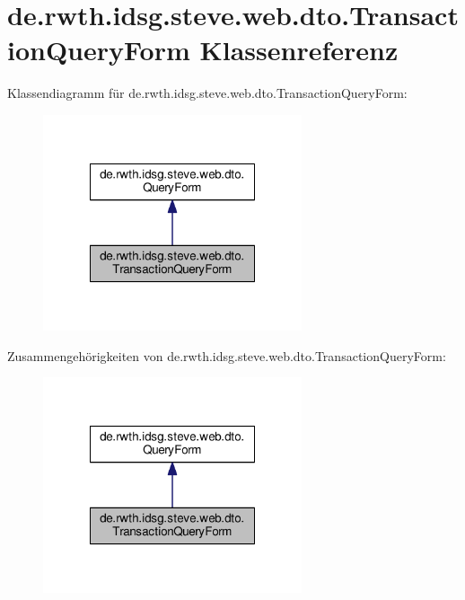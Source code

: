 \hypertarget{classde_1_1rwth_1_1idsg_1_1steve_1_1web_1_1dto_1_1_transaction_query_form}{\section{de.\-rwth.\-idsg.\-steve.\-web.\-dto.\-Transaction\-Query\-Form Klassenreferenz}
\label{classde_1_1rwth_1_1idsg_1_1steve_1_1web_1_1dto_1_1_transaction_query_form}
}


Klassendiagramm für de.\-rwth.\-idsg.\-steve.\-web.\-dto.\-Transaction\-Query\-Form\-:\nopagebreak
\begin{figure}[H]
\begin{center}
\leavevmode
\includegraphics[width=216pt]{classde_1_1rwth_1_1idsg_1_1steve_1_1web_1_1dto_1_1_transaction_query_form__inherit__graph}
\end{center}
\end{figure}


Zusammengehörigkeiten von de.\-rwth.\-idsg.\-steve.\-web.\-dto.\-Transaction\-Query\-Form\-:\nopagebreak
\begin{figure}[H]
\begin{center}
\leavevmode
\includegraphics[width=216pt]{classde_1_1rwth_1_1idsg_1_1steve_1_1web_1_1dto_1_1_transaction_query_form__coll__graph}
\end{center}
\end{figure}
